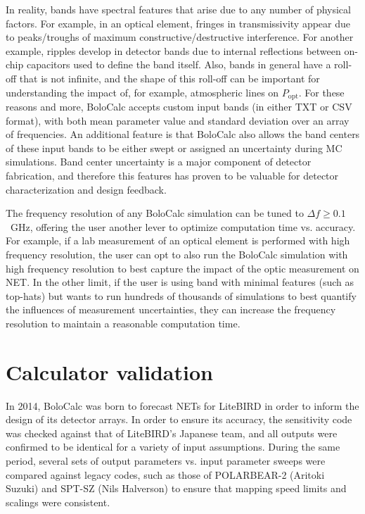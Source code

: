In reality, bands have spectral features that arise due to any number of physical factors. For example, in an optical element,  fringes in transmissivity appear due to peaks/troughs of maximum constructive/destructive interference. For another example, ripples develop in detector bands due to internal reflections between on-chip capacitors used to define the band itself. Also, bands in general have a roll-off that is not infinite, and the shape of this roll-off can be important for understanding the impact of, for example, atmospheric lines on $P_{\mathrm{opt}}$. For these reasons and more, BoloCalc accepts custom input bands (in either TXT or CSV format), with both mean parameter value and standard deviation over an array of frequencies. An additional feature is that BoloCalc also allows the band centers of these input bands to be either swept or assigned an uncertainty during MC simulations. Band center uncertainty is a major component of detector fabrication, and therefore this features has proven to be valuable for detector characterization and design feedback.

The frequency resolution of any BoloCalc simulation can be tuned to $\Delta f \geq 0.1$~GHz, offering the user another lever to optimize computation time vs. accuracy. For example, if a lab measurement of an optical element is performed with high frequency resolution, the user can opt to also run the BoloCalc simulation with high frequency resolution to best capture the impact of the optic measurement on NET. In the other limit, if the user is using band with minimal features (such as top-hats) but wants to run hundreds of thousands of simulations to best quantify the influences of measurement uncertainties, they can increase the frequency resolution to maintain a reasonable computation time. 


\section{Calculator validation}
\label{sec:bolocalc_validation}

In 2014, BoloCalc was born to forecast NETs for LiteBIRD in order to inform the design of its detector arrays. In order to ensure its accuracy, the sensitivity code was checked against that of LiteBIRD's Japanese team, and all outputs were confirmed to be identical for a variety of input assumptions. During the same period, several sets of output parameters vs. input parameter sweeps were compared against legacy codes, such as those of POLARBEAR-2 (Aritoki Suzuki) and SPT-SZ (Nils Halverson) to ensure that mapping speed limits and scalings were consistent.


